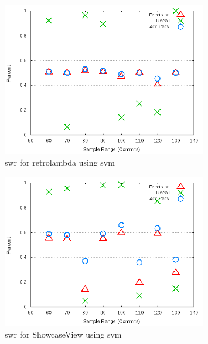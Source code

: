 \begin{figure}[!t]
\centering
\includegraphics[width=0.8\textwidth]{images/svm/test_1/retrolambda_sample_range.png}
\caption{\gls{swr} for retrolambda using \gls{svm}}
\label{fig:test_1_retrolambda_svm}
\end{figure}

\begin{figure}[!t]
\centering
\includegraphics[width=0.8\textwidth]{images/svm/test_1/ShowcaseView_sample_range.png}
\caption{\gls{swr} for ShowcaseView using \gls{svm}}
\label{fig:test_1_ShowcaseView_svm}
\end{figure}

